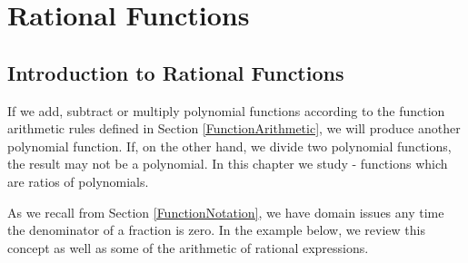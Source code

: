 \section{Rational Functions}
\subsection{Introduction to Rational Functions}
\label{IntroRational}

If we add, subtract or multiply polynomial functions according to the function arithmetic rules defined in Section \ref{FunctionArithmetic}, we will produce another polynomial function. If, on the other hand, we divide two polynomial functions, the result may not be a polynomial.  In this chapter we study   - functions which are ratios of polynomials.

\smallskip



\smallskip

As we recall from Section \ref{FunctionNotation}, we have domain issues any time the denominator of a fraction is zero.  In the example below, we review this concept as well as some of the arithmetic of rational expressions.

\medskip

